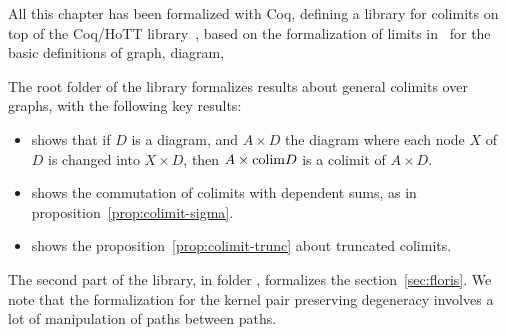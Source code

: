 All this chapter has been formalized with Coq, defining a library for
colimits on top of the Coq/HoTT library~\cite{hottlib}, based on the
formalization of limits in~\cite{lumsdaine} for the basic definitions
of graph, diagram, \etc{}

The root folder of the library formalizes results about general
colimits over graphs, with the following key results:
\begin{itemize}
\item {} shows that if $D$ is a
  diagram, and $A\times D$ the diagram where each node $X$ of $D$ is
  changed into $X\times D$, then $A\times\mathrm{colim} D$ is a colimit of
  $A\times D$.
\item {} shows the commutation
  of colimits with dependent sums, as in
  proposition~\ref{prop:colimit-sigma}.
\item {} shows the
  proposition~\ref{prop:colimit-trunc} about truncated colimits.
\end{itemize}

The second part of the library, in folder ,
formalizes the section~\ref{sec:floris}. We note that the
formalization for the kernel pair preserving degeneracy involves a lot
of manipulation of paths between paths.






